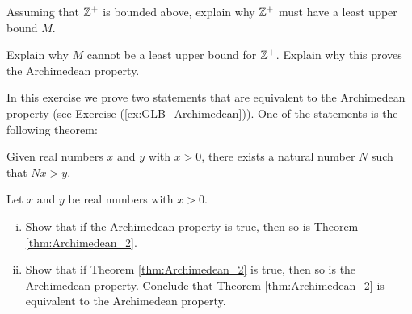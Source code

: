 \item Assuming that $\mathbb{Z}^+$ is bounded above, explain why $\mathbb{Z}^+$ must have a least upper bound $M$. 

\item Explain why $M$ cannot be a least upper bound for $\mathbb{Z}^+$. Explain why this proves the Archimedean property. 



\ea

\begin{comment}

\ExerciseSolution

\ba

\item If there is no positive integer $N$ such that $N > x$, then $x$ is an upper bound for $\Z^+$. 

\item The fact that $1 \in \Z^+$ means that $\Z^+$ is not empty. Since $\Z+$ is not empty and bounded above, it follows that $\Z^+$ has a least upper bound $M$.

\item Let $M' = \lfloor M \rfloor$, that is $M'$ is the largest integer less than $M$. (Think of truncating the decimal expansion of $M$ at the units place -- $\lfloor 3.14 \rfloor = 3$, for example). Since $M$ is the largest integer less than $M$, it follows that $M < M'+1$. But $M'+1$ is a positive integer larger than $M$, so $M$ can't be an upper bound for $\Z^+$. This contradiction shows that there must be a positive integer $N$ such that $N > x$.
\ea

\end{comment}

\item \label{ex:GLB_Archimedean_2} In this exercise we prove two statements that are equivalent to the Archimedean property (see Exercise (\ref{ex:GLB_Archimedean})). One of the statements is the following theorem:

\begin{theorem} \label{thm:Archimedean_2} Given real numbers $x$ and $y$ with $x > 0$, there exists a natural number $N$ such that $Nx > y$. 
\end{theorem}

\ba

\item Let $x$ and $y$ be real numbers with $x > 0$. 

	\begin{enumerate}[i.]
	\item Show that if the Archimedean property is true, then so is Theorem \ref{thm:Archimedean_2}. 

	\item Show that if Theorem \ref{thm:Archimedean_2} is true, then so is the Archimedean property.  Conclude that Theorem \ref{thm:Archimedean_2} is equivalent to the Archimedean property.
	
	\end{enumerate}
	
